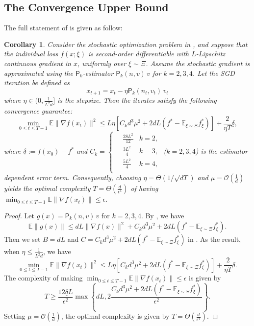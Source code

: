 \documentclass{article}
\newcommand{\EE}{\mathbb{E}}
\newcommand{\calO}{\mathcal{O}}
\theoremstyle{definition}
\theoremstyle{plain}
\newtheorem{corollary}[definition]{Corollary}
\theoremstyle{remark}
\newcommand{\sfP}{\mathsf{P}}
\begin{document}
\subsection{The Convergence Upper Bound}\label{sec:convergence-proof-appendix}
The full statement of  is given as follow:
\begin{corollary}
Consider the stochastic optimization problem in , and suppose that the individual loss \( f(x;\xi) \) is second-order differentiable with \( L \)-Lipschitz continuous gradient in \( x \), uniformly over \(\xi\sim\Xi\). Assume the stochastic gradient is approximated using the $\sfP_k$-estimator \( \sfP_k(n,v)\,v \) for \(k =2,3,4\). Let the SGD iteration be defined as 
$$x_{t+1} = x_t - \eta \sfP_k(n_t, v_t)\,v_t$$ where $\eta \in (0, \frac{1}{L^2d}]$ is the stepsize. Then the iterates satisfy the following convergence guarantee:
    $$\min_{0\leq t \leq T-1} \EE \|\nabla f(x_t)\|^2 \leq L  \eta \left[ C_k d^3 \mu^2 + 2dL (f^* - \EE_{\xi\sim\Xi} f^*_\xi)\right] + \frac{2}{\eta T}\underline{\delta},$$
    where $\underline{\delta}:=f(x_0) - f^*$ and $C_k =\begin{cases}
        \quad \frac{28L^2}{12} &k=2, \\ 
        \quad \frac{3L^2}{4}   &k=3, \\
        \quad \frac{5L^2}{4}  &k=4, \\
    \end{cases}$ ($k=2,3,4$) is the estimator-dependent error term. Consequently, choosing \(\eta = \Theta(1/\sqrt{dT})\) and $\mu = \mathcal{O}(\frac{1}{d})$ yields the optimal complexity $T = \Theta(\frac{d}{\epsilon^4})$ of having $\min_{0\leq t \leq T-1} \EE \|\nabla f(x_t)\| \leq \epsilon$. 
\end{corollary}
\begin{proof}
    Let $g(x) = \sfP_k(n,v)\,v$ for $k=2,3,4$. By , we have
    $$\EE \|g(x) \| \leq d L \|\nabla f(x)\|^2 +  C_k d^3 \mu^2 + 2dL (f^* - \EE_{\xi\sim\Xi} f^*_\xi).$$
    Then we set $B=d L$ and $C= C_k d^3 \mu^2 + 2dL (f^* - \EE_{\xi\sim\Xi} f^*_\xi)$ in .  As the result, when $\eta \leq \frac{1}{L^2 d}$,  we have 
    $$\min_{0\leq t \leq T-1} \EE \|\nabla f(x_t)\|^2 \leq L  \eta \left[ C_k d^3 \mu^2 + 2dL (f^* - \EE_{\xi\sim\Xi} f^*_\xi)\right] + \frac{2}{\eta T}\underline{\delta}.$$
    The complexity of making $\min_{0\leq t \leq T-1} \EE \|\nabla f(x_t)\| \leq \epsilon$ is given by
    $$T \geq \frac{12 \underline{\delta} L}{\epsilon^2} \max \left\{ d L, 2\frac{ C_k d^3 \mu^2 + 2dL (f^* - \EE_{\xi\sim\Xi} f^*_\xi) }{ \epsilon^2} \right\}.$$
    Setting $\mu = \calO(\frac{1}{d})$, the optimal complexity is given by $T=\Theta(\frac{d}{\epsilon^4})$.
\end{proof}
\end{document}
